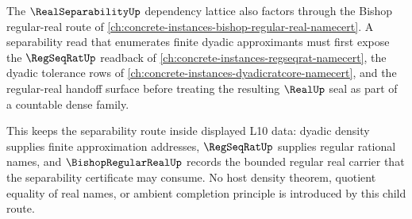 The $\RealSeparabilityUp$ dependency lattice also factors through the Bishop regular-real route of \autoref{ch:concrete-instances-bishop-regular-real-namecert}. A separability read that enumerates finite dyadic approximants must first expose the $\RegSeqRatUp$ readback of \autoref{ch:concrete-instances-regseqrat-namecert}, the dyadic tolerance rows of \autoref{ch:concrete-instances-dyadicratcore-namecert}, and the regular-real handoff surface before treating the resulting $\RealUp$ seal as part of a countable dense family.

This keeps the separability route inside displayed L10 data: dyadic density supplies finite approximation addresses, $\RegSeqRatUp$ supplies regular rational names, and $\BishopRegularRealUp$ records the bounded regular real carrier that the separability certificate may consume. No host density theorem, quotient equality of real names, or ambient completion principle is introduced by this child route.
